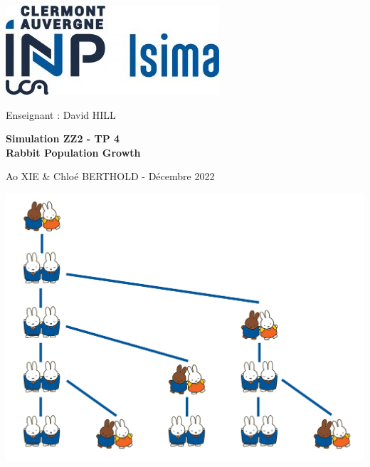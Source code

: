 \documentclass[12pt]{article}
\begin{document}
    \def\arraystretch{1.5}
        \includegraphics[scale = 0.8]{Photos/isima.jpg}  
        \hfill
        \begin{large}
            Enseignant : David HILL
        \end{large}
        
    \vspace{3cm}
    \begin{center}
        \begin{Huge}
            \textbf{Simulation ZZ2 - TP 4}
            \\
            \vspace{0.3cm}
            \textbf{Rabbit Population Growth}
        \end{Huge}
    \end{center}
    
    \begin{center}
        \begin{large}
            Ao XIE \& Chloé BERTHOLD - Décembre 2022
        \end{large}
    \end{center}
    
    \vspace{1.5cm}
	\begin{center}
	    \includegraphics[width=15cm]{Photos/Miffy_Fibonacci.jpg}
	\end{center}
\end{document}
